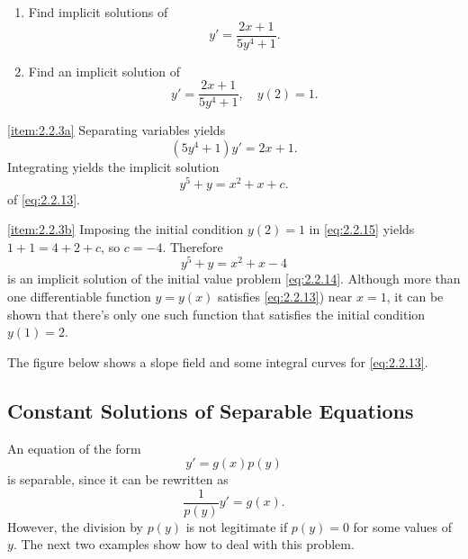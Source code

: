 \documentclass{ximera}
\begin{document}
\begin{example}\label{example:2.2.3}
\begin{enumerate}
\item\label{item:2.2.3a}
Find implicit solutions of
\begin{equation} \label{eq:2.2.13}
y'=\frac{2x+1}{5y^4+1}.
\end{equation}
\item\label{item:2.2.3b}
Find an implicit solution of
\begin{equation} \label{eq:2.2.14}
y'=\frac{2x+1}{5y^4+1},\quad y(2)=1.
\end{equation}
\end{enumerate}
 
\begin{explanation}
\ref{item:2.2.3a}
 Separating variables yields
$$
(5y^4+1)y'=2x+1.
$$
Integrating yields the implicit solution
\begin{equation} \label{eq:2.2.15}
y^5+y=x^2+x+ c.
\end{equation}
of \eqref{eq:2.2.13}.
 
\ref{item:2.2.3b} Imposing the initial condition $y(2)=1$ in
\eqref{eq:2.2.15} yields $1+1=4+2+c$, so $c=-4$. Therefore
$$
y^5+y=x^2+x-4
$$
is an implicit solution of the initial value problem \eqref{eq:2.2.14}.
Although more than one differentiable function $y=y(x)$ satisfies
\ref{eq:2.2.13}) near $x=1$, it can be shown that there's only
one such function that satisfies the initial condition $y(1)=2$.
 
The figure below shows a slope field and some integral curves
for \eqref{eq:2.2.13}.

\begin{center}
\end{center}
 
 
\end{explanation}
\end{example}
 
\subsection*{Constant Solutions of Separable Equations}
 
An equation of the form
$$
y'=g(x)p(y)
$$
 is separable, since it can be rewritten as
$$
\frac{1}{p(y)}y'=g(x).
$$
 However, the division by  $p(y)$
is not legitimate  if $p(y)=0$ for some values of $y$.  The
next two examples show how to deal with this problem.
 
\end{document}
